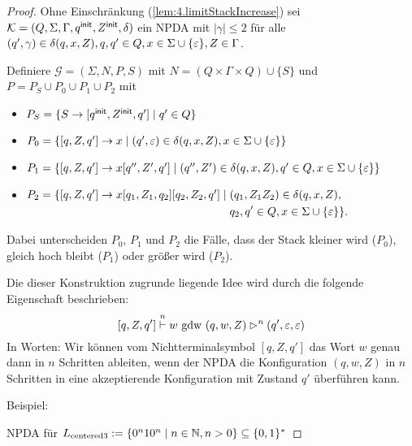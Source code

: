\begin{proof}
 Ohne Einschränkung (\autoref{lem:4.limitStackIncrease}) sei $\mathcal{K} = (Q, \Sigma, \Gamma, \qinit, \Zinit, \delta)$ ein \ac{NPDA} mit $|\gamma| \le 2$ für alle $(q', \gamma) \in \delta(q, x, Z), q, q' \in Q, x \in \Sigma \cup \{\Eps\}, Z \in \Gamma$.

    Definiere $\mathcal{G} = (\Sigma, N, P, S)$ mit $N = (Q \times \Gamma \times Q) \cup \{S\}$ und $P=P_S\cup P_0\cup P_1\cup P_2$ mit
    \begin{itemize}
    \item $P_S = \{S \to [\qinit, \Zinit, q']\mid q'\in Q\}$
    \item $P_0 = \{ [q, Z, q'] \to x \mid (q', \Eps)\in \delta(q, x, Z), x \in \Sigma \cup \{\Eps\} \}$
    \item $P_1 = \{[q, Z, q'] \to x[q'', Z', q'] \mid (q'', Z')\in \delta(q, x, Z), q' \in Q, x \in \Sigma \cup \{\Eps\}\}$
    \item $P_2 = \{[q, Z, q'] \to x[q_1,Z_1,q_2][q_2, Z_2, q'] \mid
        \begin{aligned}[t]
          & (q_1, Z_1Z_2)\in\delta(q, x, Z), \\
          & q_2, q' \in Q, x \in \Sigma \cup \{\Eps\} \}.
        \end{aligned}$
    \end{itemize}
    
    Dabei unterscheiden $P_0$, $P_1$ und $P_2$ die Fälle, dass der Stack kleiner wird ($P_0$), gleich hoch bleibt ($P_1$) oder größer wird ($P_2$).
    
    Die dieser Konstruktion zugrunde liegende Idee wird durch die folgende Eigenschaft beschrieben:
      \begin{equation}\label{eq:npdaToCfgProp}
        [q,Z,q']\stackrel{n}{\vdash} w \text{ gdw } (q,w,Z) \ConfRel^n (q',\Eps,\Eps)
      \end{equation}
    In Worten: Wir können vom Nichtterminalsymbol $[q,Z,q']$ das Wort $w$ genau dann in $n$ Schritten ableiten,
    wenn der \ac{NPDA} die Konfiguration $(q,w,Z)$ in $n$ Schritten in eine akzeptierende Konfiguration mit Zustand $q'$ überführen kann.
    
    Beispiel:
    
    \ac{NPDA} für $L_\text{centered3}:=\{0^n10^n \mid n\in\N, n > 0 \}\subseteq\{0,1\}^*$
    
\newcommand{\el}[3]{{\color{red!70!black}#1};{\color{blue!70!black}#2};{\color{blue!70!black}#3}}
    \begin{tikzpicture}
 

\end{tikzpicture}
\end{proof}
